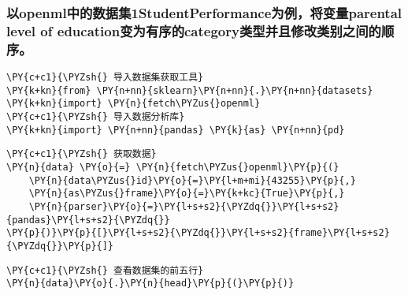     \hypertarget{ux4ee5openmlux4e2dux7684ux6570ux636eux96c61studentperformanceux4e3aux4f8bux5c06ux53d8ux91cfparental-level-of-educationux53d8ux4e3aux6709ux5e8fux7684categoryux7c7bux578bux5e76ux4e14ux4feeux6539ux7c7bux522bux4e4bux95f4ux7684ux987aux5e8f}{%
\subsubsection{以openml中的数据集1StudentPerformance为例，将变量parental
level of
education变为有序的category类型并且修改类别之间的顺序。}\label{ux4ee5openmlux4e2dux7684ux6570ux636eux96c61studentperformanceux4e3aux4f8bux5c06ux53d8ux91cfparental-level-of-educationux53d8ux4e3aux6709ux5e8fux7684categoryux7c7bux578bux5e76ux4e14ux4feeux6539ux7c7bux522bux4e4bux95f4ux7684ux987aux5e8f}}

    \begin{tcolorbox}[breakable, size=fbox, boxrule=1pt, pad at break*=1mm,colback=cellbackground, colframe=cellborder]
\begin{Verbatim}[commandchars=\\\{\}]
\PY{c+c1}{\PYZsh{} 导入数据集获取工具}
\PY{k+kn}{from} \PY{n+nn}{sklearn}\PY{n+nn}{.}\PY{n+nn}{datasets} \PY{k+kn}{import} \PY{n}{fetch\PYZus{}openml}
\PY{c+c1}{\PYZsh{} 导入数据分析库}
\PY{k+kn}{import} \PY{n+nn}{pandas} \PY{k}{as} \PY{n+nn}{pd}
\end{Verbatim}
\end{tcolorbox}

    \begin{tcolorbox}[breakable, size=fbox, boxrule=1pt, pad at break*=1mm,colback=cellbackground, colframe=cellborder]
\begin{Verbatim}[commandchars=\\\{\}]
\PY{c+c1}{\PYZsh{} 获取数据}
\PY{n}{data} \PY{o}{=} \PY{n}{fetch\PYZus{}openml}\PY{p}{(}
    \PY{n}{data\PYZus{}id}\PY{o}{=}\PY{l+m+mi}{43255}\PY{p}{,}
    \PY{n}{as\PYZus{}frame}\PY{o}{=}\PY{k+kc}{True}\PY{p}{,}
    \PY{n}{parser}\PY{o}{=}\PY{l+s+s2}{\PYZdq{}}\PY{l+s+s2}{pandas}\PY{l+s+s2}{\PYZdq{}}
\PY{p}{)}\PY{p}{[}\PY{l+s+s2}{\PYZdq{}}\PY{l+s+s2}{frame}\PY{l+s+s2}{\PYZdq{}}\PY{p}{]}
\end{Verbatim}
\end{tcolorbox}

    \begin{tcolorbox}[breakable, size=fbox, boxrule=1pt, pad at break*=1mm,colback=cellbackground, colframe=cellborder]
\begin{Verbatim}[commandchars=\\\{\}]
\PY{c+c1}{\PYZsh{} 查看数据集的前五行}
\PY{n}{data}\PY{o}{.}\PY{n}{head}\PY{p}{(}\PY{p}{)}
\end{Verbatim}
\end{tcolorbox}

